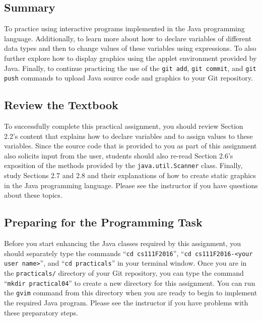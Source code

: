 


\vspace*{-.1in}
\subsection*{Summary}

To practice using interactive programs implemented in the Java programming language. Additionally, to learn more about
how to declare variables of different data types and then to change values of these variables using expressions.  To
also further explore how to display graphics using the applet environment provided by Java. Finally, to continue
practicing the use of the {\tt git add}, {\tt git commit}, and {\tt git push} commands to upload Java source code and
graphics to your Git repository.

\vspace*{-.1in}
\subsection*{Review the Textbook}

To successfully complete this practical assignment, you should review Section 2.2's content that explains how to declare
variables and to assign values to these variables. Since the source code that is provided to you as part of this
assignment also solicits input from the user, students should also re-read Section 2.6's exposition of the methods
provided by the {\tt java.util.Scanner} class. Finally, study Sections 2.7 and 2.8 and their explanations of how to
create static graphics in the Java programming language.  Please see the instructor if you have questions about
these topics.

\vspace*{-.1in}
\subsection*{Preparing for the Programming Task}

Before you start enhancing the Java classes required by this assignment, you should separately type the commands ``{\tt cd
  cs111F2016}'', ``{\tt cd cs111F2016-<your user name>}'', and ``{\tt cd practicals}'' in your terminal window. Once you
are in the {\tt practicals/} directory of your Git repository, you can type the command ``{\tt mkdir practical04}'' to
create a new directory for this assignment. You can run the {\tt gvim} command from this directory when you are ready to
begin to implement the required Java program. Please see the instructor if you have problems with these preparatory steps.

